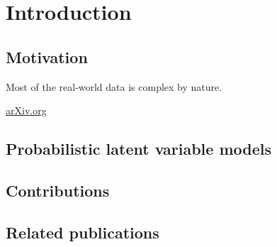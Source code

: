 
\chapter{Introduction}\label{chpt:intro}

\section{Motivation}\label{chpt:intro:sec:motivation}

Most of the real-world data is complex by nature. 

\PP 

\PP \url{arXiv.org}

\section{Probabilistic latent variable models}\label{chpt:intro:sec:model}

\section{Contributions}\label{chpt:intro:sec:contribution}

\section{Related publications}


